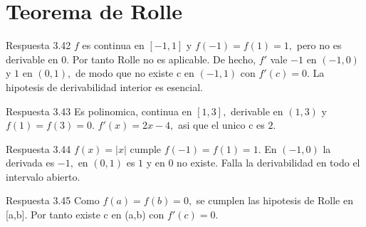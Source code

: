 \documentclass[10pt,a4paper,oneside,openany]{book}
\begin{document}
\section{Teorema de Rolle}
\begin{PSevenAnswerFixed}{Respuesta 3.42}
\(f\) es continua en \([-1,1]\) y \(f(-1)=f(1)=1,\) pero no es derivable en \(0\). Por tanto Rolle no es aplicable. De hecho, \(f'\) vale \(-1\) en \((-1,0)\) y \(1\) en \((0,1),\) de modo que no existe c en \((-1,1)\) con \(f'(c)=0\). La hipotesis de derivabilidad interior es esencial.
\end{PSevenAnswerFixed}
\begin{PSevenAnswerFixed}{Respuesta 3.43}
Es polinomica, continua en \([1,3],\) derivable en \((1,3)\) y \(f(1)=f(3)=0\). \(f'(x)=2x-4,\) asi que el unico c es \(2\).
\end{PSevenAnswerFixed}
\begin{PSevenAnswerFixed}{Respuesta 3.44}
\(f(x)=|x|\) cumple \(f(-1)=f(1)=1\). En \((-1,0)\) la derivada es \(-1,\) en \((0,1)\) es \(1\) y en \(0\) no existe. Falla la derivabilidad en todo el intervalo abierto.
\end{PSevenAnswerFixed}
\begin{PSevenAnswerFixed}{Respuesta 3.45}
Como \(f(a)=f(b)=0,\) se cumplen las hipotesis de Rolle en [a,b]. Por tanto existe c en (a,b) con \(f'(c)=0\).
\end{PSevenAnswerFixed}
\end{document}
